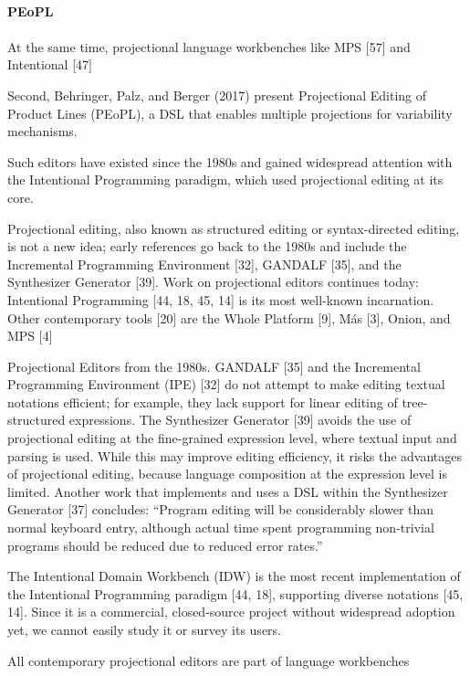 \paragraph{PEoPL}
\paragraph{}
At the same time, projectional language workbenches like MPS [57] and Intentional [47]

Second, Behringer, Palz, and Berger (2017) present Projectional Editing of Product Lines (PEoPL), a DSL that enables multiple projections for variability mechanisms.

Such editors have existed since the 1980s and gained widespread attention with the Intentional Programming paradigm, which used projectional editing at its core.

Projectional editing, also known as structured editing or syntax-directed editing, is not a new idea; early references go back to the 1980s and include the Incremental Programming Environment [32], GANDALF [35], and the Synthesizer Generator [39].
Work on projectional editors continues today: Intentional Programming [44, 18, 45, 14] is its most well-known incarnation.
Other contemporary tools [20] are the Whole Platform [9], M\'as [3], Onion, and MPS [4]

Projectional Editors from the 1980s.
GANDALF [35] and the Incremental Programming Environment (IPE) [32] do not attempt to make editing textual notations efficient; for example, they lack support for linear editing of tree-structured expressions.
The Synthesizer Generator [39] avoids the use of projectional editing at the fine-grained expression level, where textual input and parsing is used.
While this may improve editing efficiency, it risks the advantages of projectional editing, because language composition at the expression level is limited.
Another work that implements and uses a DSL within the Synthesizer Generator [37] concludes: “Program editing will be considerably slower than normal keyboard entry, although actual time spent programming non-trivial programs should be reduced due to reduced error rates.”

The Intentional Domain Workbench (IDW) is the most recent implementation of the Intentional Programming paradigm [44, 18], supporting diverse notations [45, 14].
Since it is a commercial, closed-source project without widespread adoption yet, we cannot easily study it or survey its users.


All contemporary projectional editors are part of language workbenches

